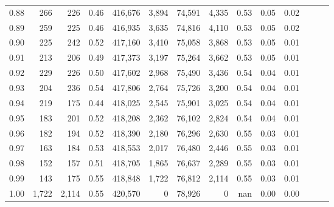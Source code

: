 \begin{tabular}{rrrrrrrrrrrrrr}
0.88 &     266 &    226 &  0.46 &  416,676 &    3,894 &  74,591 &   4,335 &  0.53 &  0.05 &      0.02 \\
0.89 &     259 &    225 &  0.46 &  416,935 &    3,635 &  74,816 &   4,110 &  0.53 &  0.05 &      0.02 \\
0.90 &     225 &    242 &  0.52 &  417,160 &    3,410 &  75,058 &   3,868 &  0.53 &  0.05 &      0.01 \\
0.91 &     213 &    206 &  0.49 &  417,373 &    3,197 &  75,264 &   3,662 &  0.53 &  0.05 &      0.01 \\
0.92 &     229 &    226 &  0.50 &  417,602 &    2,968 &  75,490 &   3,436 &  0.54 &  0.04 &      0.01 \\
0.93 &     204 &    236 &  0.54 &  417,806 &    2,764 &  75,726 &   3,200 &  0.54 &  0.04 &      0.01 \\
0.94 &     219 &    175 &  0.44 &  418,025 &    2,545 &  75,901 &   3,025 &  0.54 &  0.04 &      0.01 \\
0.95 &     183 &    201 &  0.52 &  418,208 &    2,362 &  76,102 &   2,824 &  0.54 &  0.04 &      0.01 \\
0.96 &     182 &    194 &  0.52 &  418,390 &    2,180 &  76,296 &   2,630 &  0.55 &  0.03 &      0.01 \\
0.97 &     163 &    184 &  0.53 &  418,553 &    2,017 &  76,480 &   2,446 &  0.55 &  0.03 &      0.01 \\
0.98 &     152 &    157 &  0.51 &  418,705 &    1,865 &  76,637 &   2,289 &  0.55 &  0.03 &      0.01 \\
0.99 &     143 &    175 &  0.55 &  418,848 &    1,722 &  76,812 &   2,114 &  0.55 &  0.03 &      0.01 \\
1.00 &   1,722 &  2,114 &  0.55 &  420,570 &        0 &  78,926 &       0 &   nan &  0.00 &      0.00 \\
\bottomrule
\end{tabular}
